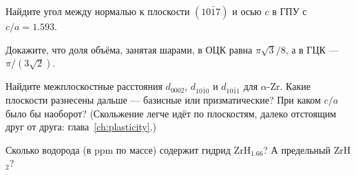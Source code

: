 \begin{exercise}
Найдите угол между нормалью к плоскости $(10\bar17)$ и осью $c$ в ГПУ с $c/a = 1.593$.
\end{exercise}

\begin{exercise}
Докажите, что доля объёма, занятая шарами, в ОЦК равна $\pi\sqrt3/8$, а в ГЦК --- $\pi/(3\sqrt2)$.
\end{exercise}

\begin{exercise}
Найдите межплоскостные расстояния $d_{0002}$, $d_{10\bar10}$ и $d_{10\bar11}$ для $\alpha$-Zr. Какие плоскости разнесены
дальше --- базисные или призматические? При каком $c/a$ было бы наоборот? (Скольжение легче идёт по плоскостям,
далеко отстоящим друг от друга: глава~\ref{ch:plasticity}.)
\end{exercise}

\begin{exercise}
Сколько водорода (в ppm по массе) содержит гидрид ZrH$_{1.66}$? А предельный ZrH$_2$?
\end{exercise}
